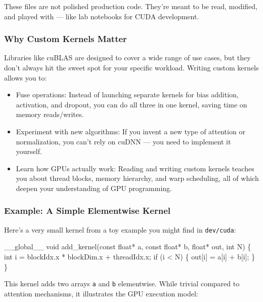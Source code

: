 \documentclass[
  letterpaper,
  DIV=11,
  numbers=noendperiod]{scrreprt}
\newenvironment{Shaded}{\begin{snugshade}}{\end{snugshade}}
\newcommand{\NormalTok}[1]{\textcolor[rgb]{0.00,0.23,0.31}{#1}}
\providecommand{\tightlist}{%
  \setlength{\itemsep}{0pt}\setlength{\parskip}{0pt}}
\begin{document}
These files are not polished production code. They're meant to be read,
modified, and played with --- like lab notebooks for CUDA development.

\subsubsection{Why Custom Kernels
Matter}\label{why-custom-kernels-matter}

Libraries like cuBLAS are designed to cover a wide range of use cases,
but they don't always hit the sweet spot for your specific workload.
Writing custom kernels allows you to:

\begin{itemize}
\tightlist
\item
  Fuse operations: Instead of launching separate kernels for bias
  addition, activation, and dropout, you can do all three in one kernel,
  saving time on memory reads/writes.
\item
  Experiment with new algorithms: If you invent a new type of attention
  or normalization, you can't rely on cuDNN --- you need to implement it
  yourself.
\item
  Learn how GPUs actually work: Reading and writing custom kernels
  teaches you about thread blocks, memory hierarchy, and warp
  scheduling, all of which deepen your understanding of GPU programming.
\end{itemize}

\subsubsection{Example: A Simple Elementwise
Kernel}\label{example-a-simple-elementwise-kernel}

Here's a very small kernel from a toy example you might find in
\texttt{dev/cuda}:

\begin{Shaded}
\begin{Highlighting}[]
\NormalTok{\_\_global\_\_ void add\_kernel(const float* a, const float* b, float* out, int N) \{}
\NormalTok{    int i = blockIdx.x * blockDim.x + threadIdx.x;}
\NormalTok{    if (i \textless{} N) \{}
\NormalTok{        out[i] = a[i] + b[i];}
\NormalTok{    \}}
\NormalTok{\}}
\end{Highlighting}
\end{Shaded}

This kernel adds two arrays \texttt{a} and \texttt{b} elementwise. While
trivial compared to attention mechanisms, it illustrates the GPU
execution model:
\end{document}
